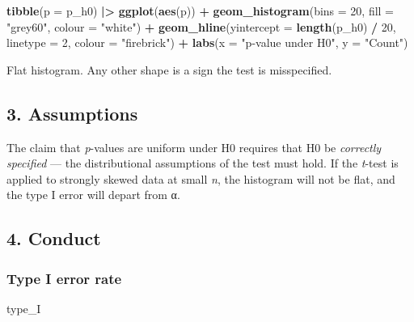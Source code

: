 \documentclass[
]{article}
\newenvironment{Shaded}{\begin{snugshade}}{\end{snugshade}}
\newcommand{\AttributeTok}[1]{\textcolor[rgb]{0.13,0.29,0.53}{#1}}
\newcommand{\DecValTok}[1]{\textcolor[rgb]{0.00,0.00,0.81}{#1}}
\newcommand{\FunctionTok}[1]{\textcolor[rgb]{0.13,0.29,0.53}{\textbf{#1}}}
\newcommand{\NormalTok}[1]{#1}
\newcommand{\SpecialCharTok}[1]{\textcolor[rgb]{0.81,0.36,0.00}{\textbf{#1}}}
\newcommand{\StringTok}[1]{\textcolor[rgb]{0.31,0.60,0.02}{#1}}
\begin{document}
\begin{Shaded}
\begin{Highlighting}[]
\FunctionTok{tibble}\NormalTok{(}\AttributeTok{p =}\NormalTok{ p\_h0) }\SpecialCharTok{|\textgreater{}}
  \FunctionTok{ggplot}\NormalTok{(}\FunctionTok{aes}\NormalTok{(p)) }\SpecialCharTok{+}
  \FunctionTok{geom\_histogram}\NormalTok{(}\AttributeTok{bins =} \DecValTok{20}\NormalTok{, }\AttributeTok{fill =} \StringTok{"grey60"}\NormalTok{, }\AttributeTok{colour =} \StringTok{"white"}\NormalTok{) }\SpecialCharTok{+}
  \FunctionTok{geom\_hline}\NormalTok{(}\AttributeTok{yintercept =} \FunctionTok{length}\NormalTok{(p\_h0) }\SpecialCharTok{/} \DecValTok{20}\NormalTok{,}
             \AttributeTok{linetype =} \DecValTok{2}\NormalTok{, }\AttributeTok{colour =} \StringTok{"firebrick"}\NormalTok{) }\SpecialCharTok{+}
  \FunctionTok{labs}\NormalTok{(}\AttributeTok{x =} \StringTok{"p{-}value under H0"}\NormalTok{, }\AttributeTok{y =} \StringTok{"Count"}\NormalTok{)}
\end{Highlighting}
\end{Shaded}

Flat histogram. Any other shape is a sign the test is misspecified.

\subsection{3. Assumptions}\label{assumptions}

The claim that \emph{p}-values are uniform under H0 requires that H0 be
\emph{correctly specified} --- the distributional assumptions of the
test must hold. If the \emph{t}-test is applied to strongly skewed data
at small \emph{n}, the histogram will not be flat, and the type I error
will depart from α.

\subsection{4. Conduct}\label{conduct}

\subsubsection{Type I error rate}\label{type-i-error-rate}

\begin{Shaded}
\begin{Highlighting}[]
\NormalTok{type\_I}
\end{Highlighting}
\end{Shaded}
\end{document}
